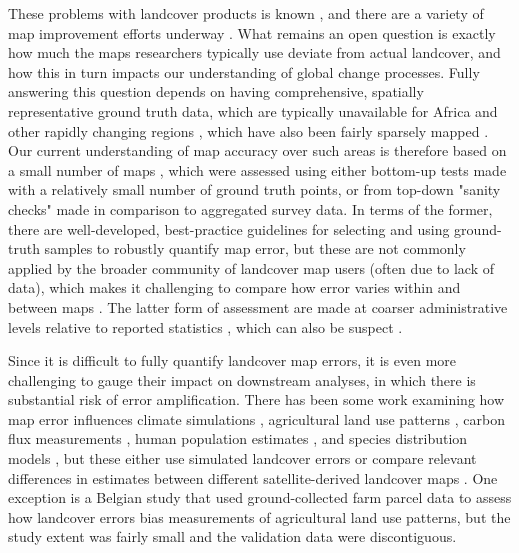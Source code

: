 \documentclass{pnastwo}
\begin{document}
\begin{article}
These problems with landcover products is known \cite{fritz_comparison_2010, fritz_cropland_2011, see_improved_2015, fritz_mapping_2015,verburg_challenges_2011}, and there are a variety of map improvement efforts underway \cite[e.g.][]{fritz_geo-wiki:_2012, estes_platform_2015}. What remains an open question is exactly how much the maps researchers typically use deviate from actual landcover, and how this in turn impacts our understanding of global change processes. Fully answering this question depends on having comprehensive, spatially representative ground truth data, which are typically unavailable for Africa and other rapidly changing regions \cite{see_improved_2015}, which have also been fairly sparsely mapped \cite{yu_meta-discoveries_2014}. Our current understanding of map accuracy over such areas is therefore based on a small number of maps \cite{yu_meta-discoveries_2014}, which were assessed using either bottom-up tests made with a relatively small number of ground truth points, or from top-down "sanity checks" made in comparison to aggregated survey data.  In terms of the former, there are well-developed, best-practice guidelines for selecting and using ground-truth samples to robustly quantify map error, but these are not commonly applied by the broader community of landcover map users (often due to lack of data), which makes it challenging to compare how error varies within and between maps \cite{stehman_global_2012, olofsson_making_2013,olofsson_good_2014,foody_status_2002}. The latter form of assessment are made at coarser administrative levels relative to reported statistics \cite[e.g.][]{fritz_comparison_2010}, which can also be suspect \cite{carletto_emperor_2013,fao_action_2013}. 

Since it is difficult to fully quantify landcover map errors, it is even more challenging to gauge their impact on downstream analyses, in which there is substantial risk of error amplification\cite{kuemmerle_challenges_2013}. There has been some work examining how map error influences climate simulations \cite{ge_impacts_2007}, agricultural land use patterns \cite{schmit_limitations_2006}, carbon flux measurements \cite{quaife_impact_2008}, human population estimates \cite{linard_assessing_2010}, and species distribution models \cite{tuanmu_global_2014}, but these either use simulated landcover errors \cite{ge_impacts_2007} or compare relevant differences in estimates between different satellite-derived landcover maps \cite{linard_assessing_2010, quaife_impact_2008,tuanmu_global_2014}. One exception is a Belgian study \cite{schmit_limitations_2006} that used ground-collected farm parcel data to assess how landcover errors bias measurements of agricultural land use patterns, but the study extent was fairly small and the validation data were discontiguous. 


\end{article}
\end{document}
